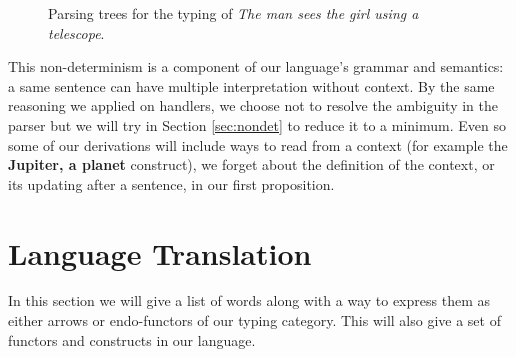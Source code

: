 \documentclass[math, english, info]{cours}
\makeatletter
\def\black@or@white#1#2{%
  \@tempdima#2 pt
  \ifdim\@tempdima>0.5 pt
    \definecolor{temp@c}{gray}{0}%
  \else
    \definecolor{temp@c}{gray}{1}%
  \fi}
\def\letterbox#1#{\protect\letterb@x{#1}}
\def\letterb@x#1#2#3{%
  \colorlet{temp@c}[gray]{#2}%
  \extractcolorspec{temp@c}{\color@spec}%
  \expandafter\black@or@white\color@spec
  {\color#1{temp@c}\tallcbox#1{#2}{#3}}}
\def\tallcbox#1#{\protect\color@box{#1}}
\def\color@box#1#2{\color@b@x\relax{\color#1{#2}}}
\def\backbox#1{\letterbox{Lavender!40}{\contour{black}{#1}}}
\def\ty#1{\backbox{\tt\color{yulm!90!black}#1}}
\def\f#1{\backbox{\tt\color{vulm}#1}}
\def\e{\ty{e}}
\def\t{\ty{t}}
\makeatother
\begin{document}
\begin{figure*}
\centering
{}
  \caption{Parsing trees for the typing of \textsl{The man sees the girl using a telescope}.}
  \label{fig:ud}
\end{figure*}

This non-determinism is a component of our language's grammar and semantics: a same sentence can have multiple interpretation without context.
By the same reasoning we applied on handlers, we choose not to resolve the ambiguity in the parser but we will try in Section \ref{sec:nondet} to reduce it to a minimum.
Even so some of our derivations will include ways to read from a context (for example the \textbf{Jupiter, a planet} construct), we forget about the definition of the context, or its updating after a sentence, in our first proposition.

\section{Language Translation}
\label{sec:language}
In this section we will give a list of words along with a way to express them as either arrows or endo-functors of our typing category.
This will also give a set of functors and constructs in our language.
\end{document}

